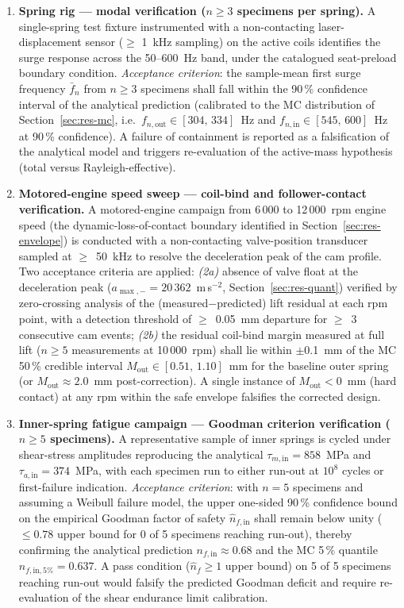 \begin{enumerate}
\item \textbf{Spring rig --- modal verification ($n\geq 3$
specimens per spring).} A single-spring test fixture
instrumented with a non-contacting laser-displacement sensor
($\geq$ 1~kHz sampling) on the active coils identifies the surge
response across the 50--600~Hz band, under the catalogued
seat-preload boundary condition.
\emph{Acceptance criterion}: the sample-mean first surge frequency
$\bar{f}_{n}$ from $n\geq 3$ specimens shall fall within the 90\,\%
confidence interval of the analytical prediction (calibrated to the
MC distribution of Section~\ref{sec:res-mc}, i.e.\
$f_{n,\mathrm{out}}\in [304,\,334]$~Hz and
$f_{n,\mathrm{in}}\in [545,\,600]$~Hz at 90\,\% confidence). A
failure of containment is reported as a falsification of the
analytical model and triggers re-evaluation of the active-mass
hypothesis (total versus Rayleigh-effective).

\item \textbf{Motored-engine speed sweep --- coil-bind and
follower-contact verification.} A motored-engine campaign from
6\,000 to 12\,000~rpm engine speed (the dynamic-loss-of-contact
boundary identified in Section~\ref{sec:res-envelope}) is
conducted with a non-contacting valve-position transducer sampled
at $\geq$~50~kHz to resolve the deceleration peak of the cam
profile. Two acceptance criteria are applied:
\emph{(2a)} absence of valve float at the deceleration peak
($a_{\max,-}=20\,362$~m\,s$^{-2}$, Section~\ref{sec:res-quant})
verified by zero-crossing analysis of the
(measured$-$predicted) lift residual at each rpm point, with a
detection threshold of $\geq$~0.05~mm departure for $\geq$~3
consecutive cam events;
\emph{(2b)} the residual coil-bind margin measured at full lift
($n\geq 5$ measurements at 10\,000~rpm) shall lie within
$\pm$0.1~mm of the MC 50\,\% credible interval
$M_{\mathrm{out}}\in [0.51,\,1.10]$~mm for the baseline outer
spring (or $M_{\mathrm{out}}\approx 2.0$~mm post-correction). A
single instance of $M_{\mathrm{out}}<0$~mm (hard contact) at any
rpm within the safe envelope falsifies the corrected design.

\item \textbf{Inner-spring fatigue campaign --- Goodman criterion
verification ($n\geq 5$ specimens).} A representative sample of
inner springs is cycled under shear-stress amplitudes reproducing
the analytical
$\tau_{m,\mathrm{in}}=858$~MPa and
$\tau_{a,\mathrm{in}}=374$~MPa, with each specimen run to either
run-out at $10^{8}$ cycles or first-failure indication.
\emph{Acceptance criterion}: with $n=5$ specimens and assuming a
Weibull failure model, the upper one-sided 90\,\% confidence
bound on the empirical Goodman factor of safety
$\hat{n}_{f,\mathrm{in}}$ shall remain below unity ($\leq 0.78$
upper bound for 0 of 5 specimens reaching run-out), thereby
confirming the analytical prediction
$n_{f,\mathrm{in}}\approx 0.68$ and the MC 5\,\% quantile
$n_{f,\mathrm{in,5\%}}=0.637$. A pass condition
($\hat{n}_{f}\geq 1$ upper bound) on 5 of 5 specimens reaching
run-out would falsify the predicted Goodman deficit and require
re-evaluation of the shear endurance limit calibration.
\end{enumerate}

